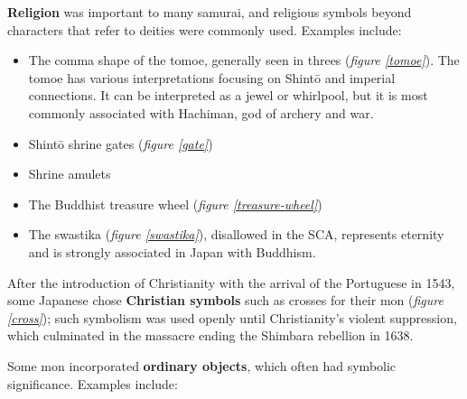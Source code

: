 \documentclass{article}
\begin{document}
  \begin{figure}
  \begin{subfigs}
  \end{subfigs}
  \begin{subfigs}
  \end{subfigs}
  \end{figure}
  
  \textbf{Religion} was important to many samurai, and religious symbols
  beyond characters that refer to deities were commonly used.  Examples
  include:
  
\begin{itemize}
\item The comma shape of the tomoe, generally seen in threes (\emph{figure
  \ref{tomoe}}).  The tomoe has various
  interpretations focusing on Shintō and imperial connections.  It can
  be interpreted as a jewel or whirlpool, but it is most commonly
  associated with Hachiman, god of archery and war.
\item Shint\=o shrine gates (\emph{figure \ref{gate}})
\item Shrine amulets
\item The Buddhist treasure wheel (\emph{figure \ref{treasure-wheel}})
\item The swastika (\emph{figure \ref{swastika}}), 
  disallowed in the SCA, represents eternity and is strongly
  associated in Japan with Buddhism.
\end{itemize}

  After the introduction of Christianity with the arrival of the
  Portuguese in 1543, some Japanese chose \textbf{Christian symbols} such
  as crosses for their mon (\emph{figure \ref{cross}});
   such symbolism was used openly until Christianity's violent
  suppression, which culminated in the massacre ending the Shimbara
  rebellion in 1638.

  Some mon incorporated \textbf{ordinary objects}, which often had symbolic
  significance.  Examples include:
\end{document}
